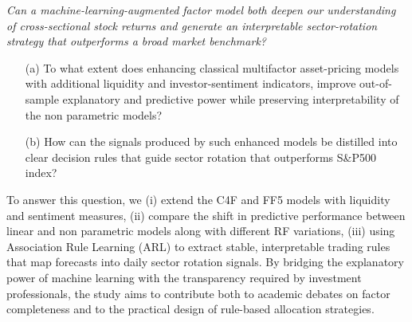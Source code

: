 \textit{Can a machine-learning-augmented factor model both deepen our understanding of cross-sectional stock returns and generate an interpretable sector-rotation strategy that outperforms a broad market benchmark?}

\begin{enumerate}
   \item[(a)] To what extent does enhancing classical multifactor asset-pricing models with additional liquidity and investor-sentiment indicators, improve out-of-sample explanatory and predictive power while preserving interpretability of the non parametric models?\\
  \item[(b)] How can the signals produced by such enhanced models be distilled into clear decision rules that guide sector rotation that outperforms S\&P500 index?\\
\end{enumerate}

To answer this question, we (i) extend the C4F and FF5 models with liquidity and sentiment measures, (ii) compare the shift in predictive performance between linear and non parametric models along with different RF variations, (iii) using Association Rule Learning (ARL) to extract stable, interpretable trading rules that map forecasts into daily sector rotation signals. By bridging the explanatory power of machine learning with the transparency required by investment professionals, the study aims to contribute both to academic debates on factor completeness and to the practical design of rule-based allocation strategies.

